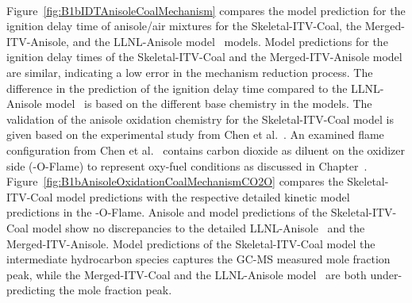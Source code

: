\begin{refsection}
\begin{figure}[t]
\end{figure}
\\
Figure~\ref{fig:B1bIDTAnisoleCoalMechanism} compares the model prediction for the ignition delay time of anisole/air mixtures for the Skeletal-ITV-Coal, the Merged-ITV-Anisole, and the LLNL-Anisole model~\cite{Wagnon2018} models. Model predictions for the ignition delay times of the Skeletal-ITV-Coal and the Merged-ITV-Anisole model are similar, indicating a low error in the mechanism reduction process. The difference in the prediction of the ignition delay time compared to the LLNL-Anisole model~\cite{Wagnon2018} is based on the different base chemistry in the models.
The validation of the anisole oxidation chemistry for the Skeletal-ITV-Coal model is given based on the experimental study from Chen et al.~\cite{Chen2022}. An examined flame configuration from Chen et al.~\cite{Chen2022} contains carbon dioxide as diluent on the oxidizer side (-O-Flame) to represent oxy-fuel conditions as discussed in Chapter~. Figure~\ref{fig:B1bAnisoleOxidationCoalMechanismCO2O} compares the Skeletal-ITV-Coal model predictions with the respective detailed kinetic model predictions in the -O-Flame. Anisole and  model predictions of the Skeletal-ITV-Coal model show no discrepancies to the detailed LLNL-Anisole~\cite{Wagnon2018} and the Merged-ITV-Anisole. Model predictions of the Skeletal-ITV-Coal model the intermediate hydrocarbon species  captures the GC-MS measured mole fraction peak, while the Merged-ITV-Coal and the LLNL-Anisole model~\cite{Wagnon2018} are both under-predicting the mole fraction peak.



\end{refsection}
